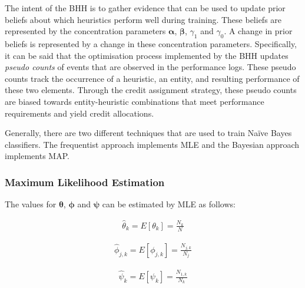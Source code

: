 The intent of the \acs{BHH} is to gather evidence that can be used to update prior beliefs about which heuristics perform well during training. These beliefs are represented by the concentration parameters $\boldsymbol{\alpha}$, $\boldsymbol{\beta}$, $\gamma_{1}$ and $\gamma_{0}$. A change in prior beliefs is represented by a change in these concentration parameters. Specifically, it can be said that the optimisation process implemented by the \acs{BHH} updates \textit{pseudo counts} of events that are observed in the performance logs. These pseudo counts track the occurrence of a heuristic, an entity, and resulting performance of these two elements. Through the credit assignment strategy, these pseudo counts are biased towards entity-heuristic combinations that meet performance requirements and yield credit allocations.

Generally, there are two different techniques that are used to train Naïve Bayes classifiers. The frequentist approach implements \acf{MLE} and the Bayesian approach implements \acf{MAP}.


\subsubsection{Maximum Likelihood Estimation}\label{sec:bhh:optimisation_step:mle}

The values for $\boldsymbol{\theta}$, $\boldsymbol{\phi}$ and $\boldsymbol{\psi}$ can be estimated by \acs{MLE} as follows:

\begin{equation}
	\label{eq:bhh:optimisation_step:mle:theta}
	\begin{split}
		\hat{\theta}_{k} = E[\theta_{k}] = \frac{N_{k}}{N}
	\end{split}
\end{equation}

\begin{equation}
	\label{eq:bhh:optimisation_step:mle:phi}
	\begin{split}
		\hat{\phi}_{j,k} = E[\phi_{j,k}] = \frac{N_{j,k}}{N_{j}}
	\end{split}
\end{equation}

\begin{equation}
	\label{eq:bhh:optimisation_step:mle:psi}
	\begin{split}
		\hat{\psi}_{k} = E[\psi_{k}] = \frac{N_{1,k}}{N_{k}}
	\end{split}
\end{equation}


